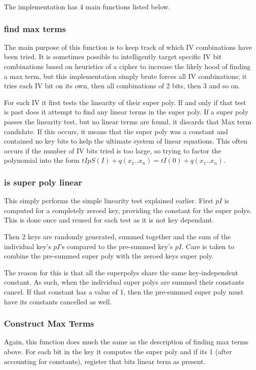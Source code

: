 \documentclass{report}
\let\Oldsubsubsection\subsubsection
\renewcommand{\subsubsection}{\FloatBarrier\Oldsubsubsection}
\begin{document}
The implementation has 4 main functions listed below.

\subsubsection{find max terms}
The main purpose of this function is to keep track of which IV combinations have been tried. It is sometimes possible to intelligently target specific IV bit combinations based on heuristics of a cipher to increase the likely hood of finding a max term, but this implementation simply brute forces all IV combinations; it tries each IV bit on its own, then all combinations of 2 bits, then 3 and so on.

For each IV it first tests the linearity of their super poly. If and only if that test is past does it attempt to find any linear terms in the super poly. If a super poly passes the linearity test, but no linear terms are found, it discards that Max term candidate. If this occurs, it means that the super poly was a constant and contained no key bits to help the ultimate system of linear equations. This often occurs if the number of IV bits tried is too large, so trying to factor the polynomial into the form $tIpS(I)+q(x_1..x_n)=tI(0)+q(x_1..x_n)$.

\subsubsection{is super poly linear}
This simply performs the simple linearity test explained earlier. First $pI$ is computed for a completely zeroed key, providing the constant for the super polys. This is done once and reused for each test as it is not key dependant.

Then 2 keys are randomly generated, summed together and the sum of the individual key's $pI$'s compared to the pre-summed key's $pI$. Care is taken to combine the pre-summed super poly with the zeroed keys super poly.

The reason for this is that all the superpolys share the same key-independent constant. As such, when the individual super polys are summed their constants cancel. If that constant has a value of 1, then the pre-summed super poly must have its constants cancelled as well.

\subsubsection{Construct Max Terms}
Again, this function does much the same as the description of finding max terms above. For each bit in the key it computes the super poly and if its 1 (after accounting for constants), register that bits linear term as present.
\end{document}
